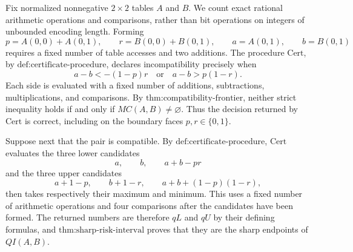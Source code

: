 Fix normalized nonnegative \(2\times2\) tables \(A\) and \(B\).  We count exact rational arithmetic operations and comparisons, rather than bit operations on integers of unbounded encoding length.  Forming
\[
p=A(0,0)+A(0,1),\qquad r=B(0,0)+B(0,1),\qquad a=A(0,1),\qquad b=B(0,1)
\]
requires a fixed number of table accesses and two additions.  The procedure \(\mathrm{Cert}\), by \(\text{def:certificate-procedure}\), declares incompatibility precisely when
\[
a-b<-(1-p)r\quad\text{or}\quad a-b>p(1-r).
\]
Each side is evaluated with a fixed number of additions, subtractions, multiplications, and comparisons.  By \(\text{thm:compatibility-frontier}\), neither strict inequality holds if and only if \(MC(A,B)\neq\varnothing\).  Thus the decision returned by \(\mathrm{Cert}\) is correct, including on the boundary faces \(p,r\in\{0,1\}\).

Suppose next that the pair is compatible.  By \(\text{def:certificate-procedure}\), \(\mathrm{Cert}\) evaluates the three lower candidates
\[
a,\qquad b,\qquad a+b-pr
\]
and the three upper candidates
\[
a+1-p,\qquad b+1-r,\qquad a+b+(1-p)(1-r),
\]
then takes respectively their maximum and minimum.  This uses a fixed number of arithmetic operations and four comparisons after the candidates have been formed.  The returned numbers are therefore \(qL\) and \(qU\) by their defining formulas, and \(\text{thm:sharp-risk-interval}\) proves that they are the sharp endpoints of \(QI(A,B)\).

